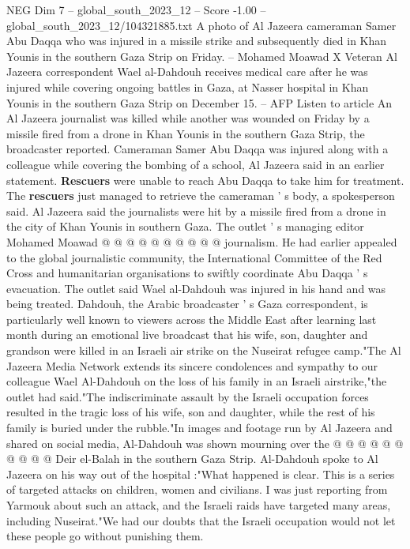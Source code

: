 \begin{textsample}{NEG Dim 7 – global\_south\_2023\_12 – Score -1.00 – global\_south\_2023\_12/104321885.txt}  \label{ex:f7_neg_190}
A photo of Al Jazeera cameraman Samer Abu Daqqa who was injured in a missile strike and subsequently died in Khan Younis in the southern Gaza Strip on Friday. -- Mohamed Moawad X Veteran Al Jazeera correspondent Wael al-Dahdouh receives medical care after he was injured while covering ongoing battles in Gaza, at Nasser hospital in Khan Younis in the southern Gaza Strip on December 15. -- AFP Listen to article An Al Jazeera journalist was killed while another was wounded on Friday by a missile fired from a drone in Khan Younis in the southern Gaza Strip, the broadcaster reported.
Cameraman Samer Abu Daqqa was injured along with a colleague while covering the bombing of a school, Al Jazeera said in an earlier statement. \textbf{Rescuers} were unable to reach Abu Daqqa to take him for treatment.
The \textbf{rescuers} just managed to retrieve the cameraman ' s body, a spokesperson said.
Al Jazeera said the journalists were hit by a missile fired from a drone in the city of Khan Younis in southern Gaza.
The outlet ' s managing editor Mohamed Moawad @ @ @ @ @ @ @ @ @ @ journalism.
He had earlier appealed to the global journalistic community, the International Committee of the Red Cross and humanitarian organisations to swiftly coordinate Abu Daqqa ' s evacuation.
The outlet said Wael al-Dahdouh was injured in his hand and was being treated.
Dahdouh, the Arabic broadcaster ' s Gaza correspondent, is particularly well known to viewers across the Middle East after learning last month during an emotional live broadcast that his wife, son, daughter and grandson were killed in an Israeli air strike on the Nuseirat refugee camp."The Al Jazeera Media Network extends its sincere condolences and sympathy to our colleague Wael Al-Dahdouh on the loss of his family in an Israeli airstrike,"the outlet had said."The indiscriminate assault by the Israeli occupation forces resulted in the tragic loss of his wife, son and daughter, while the rest of his family is buried under the rubble."In images and footage run by Al Jazeera and shared on social media, Al-Dahdouh was shown mourning over the @ @ @ @ @ @ @ @ @ @ Deir el-Balah in the southern Gaza Strip.
Al-Dahdouh spoke to Al Jazeera on his way out of the hospital :"What happened is clear.
This is a series of targeted attacks on children, women and civilians.
I was just reporting from Yarmouk about such an attack, and the Israeli raids have targeted many areas, including Nuseirat."We had our doubts that the Israeli occupation would not let these people go without punishing them.

\end{textsample}

